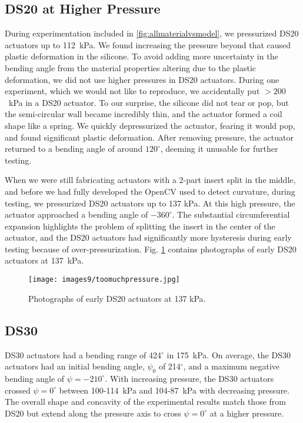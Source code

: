 \subsection{DS20 at Higher Pressure}

During experimentation included in \ref{fig:allmaterialvsmodel}, we pressurized DS20 actuators up to 112~kPa. We found increasing the pressure beyond that caused plastic deformation in the silicone. To avoid adding more uncertainty in the bending angle from the material properties altering due to the plastic deformation, we did not use higher pressures in DS20 actuators. During one experiment, which we would not like to reproduce, we accidentally put $>200$~kPa in a DS20 actuator. To our surprise, the silicone did not tear or pop, but the semi-circular wall became incredibly thin, and the actuator formed a coil shape like a spring. We quickly depressurized the actuator, fearing it would pop, and found significant plastic deformation. After removing pressure, the actuator returned to a bending angle of around $120^\circ$, deeming it unusable for further testing. 

When we were still fabricating actuators with a 2-part insert split in the middle, and before we had fully developed the OpenCV used to detect curvature, during testing, we pressurized DS20 actuators up to 137 kPa. At this high pressure, the actuator approached a bending angle of $-360^\circ$. The substantial circumferential expansion highlights the problem of splitting the insert in the center of the actuator, and the DS20 actuators had significantly more hysteresis during early testing because of over-pressurization. Fig. \ref{fig:toomuchpressure} contains photographs of early DS20 actuators at 137~kPa. 
\\
\begin{figure}[ht]
    \centering
     \texttt{[image: images9/toomuchpressure.jpg]}
    \caption{Photographs of early DS20 actuators at 137 kPa.}
    \label{fig:toomuchpressure}
\end{figure}

\clearpage
\subsection{DS30}

DS30 actuators had a bending range of 424$^\circ$ in 175~kPa. On average, the DS30 actuators had an initial bending angle, $\psi_0$ of 214$^\circ$, and a maximum negative bending angle of $\psi=-210^\circ$. With increasing pressure, the DS30 actuators crossed $\psi=0^\circ$ between 100-114~kPa and 104-87~kPa with decreasing pressure. The overall shape and concavity of the experimental results match those from DS20 but extend along the pressure axis to cross $\psi=0^\circ$ at a higher pressure. 

